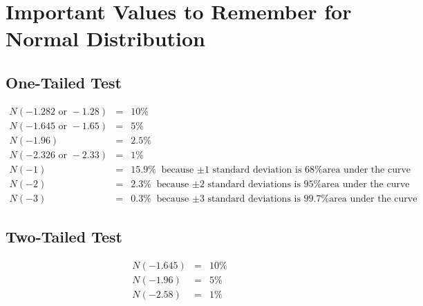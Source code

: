 \section{Important Values to Remember for Normal Distribution}

\subsection{One-Tailed Test}
\begin{eqnarray}
\nonumber
N(-1.282\text{ or }-1.28) &=& 10\%\\
\nonumber
N(-1.645\text{ or }-1.65) &=& 5\%\\
\nonumber
N(-1.96) &=& 2.5\%\\
\nonumber
N(-2.326\text{ or }-2.33) &=& 1\%\\
\nonumber
N(-1) &=& 15.9\%\text{ because $\pm$1 standard deviation is 68\% area under the curve}\\
\nonumber
N(-2) &=& 2.3\%\text{ because $\pm$2 standard deviations is 95\% area under the curve}\\
\nonumber
N(-3) &=& 0.3\%\text{ because $\pm$3 standard deviations is 99.7\% area under the curve} 	
\end{eqnarray}

\subsection{Two-Tailed Test}
\begin{eqnarray}
\nonumber
N(-1.645)&=& 10\%\\
\nonumber
N(-1.96) &=& 5\%\\
\nonumber
N(-2.58) &=& 1\%
\end{eqnarray}